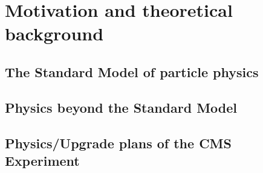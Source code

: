 \chapter{Motivation and theoretical background}

\section{The Standard Model of particle physics}

\section{Physics beyond the Standard Model}

\section{Physics/Upgrade plans of the CMS Experiment}